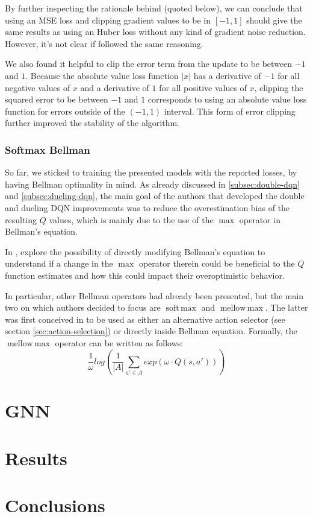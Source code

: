 \documentclass[a4paper,10pt]{report}
\DeclareMathOperator*{\softmax}{soft\,max}
\DeclareMathOperator*{\mellowmax}{mellow\,max}
\begin{document}
By further inspecting the rationale behind \citeauthor{atari-dqn} (quoted below), we can conclude that using an MSE loss and clipping gradient values to be in $[-1,1]$ should give the same results as using an Huber loss without any kind of gradient noise reduction. However, it's not clear if \citeauthor{per} followed the same reasoning.
\begin{displayquote}
	We also found it helpful to clip the error term from the update to be between $-1$ and $1$. Because the absolute value loss function $|x|$ has a derivative of $-1$ for all negative values of $x$ and a derivative of $1$ for all positive values of $x$, clipping the squared error to be between $-1$ and $1$ corresponds to using an absolute value loss function for errors outside of the $(-1,1)$ interval. This form of error clipping further improved the stability of the algorithm.
\end{displayquote}

\subsection{Softmax Bellman}
So far, we sticked to training the presented models with the reported losses, by having Bellman optimality in mind. As already discussed in \ref{subsec:double-dqn} and \ref{subsec:dueling-dqn}, the main goal of the authors that developed the double and dueling DQN improvements was to reduce the overestimation bias of the resulting $Q$ values, which is mainly due to the use of the $\max$ operator in Bellman's equation.

In \cite{softmax-bellman}, \citeauthor{softmax-bellman} explore the possibility of directly modifying Bellman's equation to understand if a change in the $\max$ operator therein could be beneficial to the $Q$ function estimates and how this could impact their overoptimistic behavior.

In particular, other Bellman operators had already been presented, but the main two on which authors decided to focus are $\softmax$ and $\mellowmax$. The latter was first conceived in \cite{mellowmax-bellman} to be used as either an alternative action selector (see section \ref{sec:action-selection}) or directly inside Bellman equation. Formally, the $\mellowmax$ operator can be written as follows:
$$
\frac{1}{\omega}log\left(\frac{1}{|A|} \sum_{a'\in A} exp(\omega \cdot Q(s,a'))\right)
$$ 


\chapter{GNN}

\chapter{Results}

\chapter{Conclusions}

\printbibliography
\end{document}
